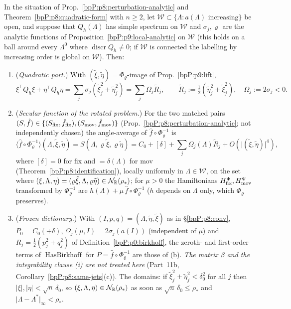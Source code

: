 \begin{theorem}\label{bpP:p9:diagonalize}
In the situation of Prop.~\ref{bpP:p8:perturbation-analytic} and Theorem~\ref{bpP:p8:quadratic-form} with $n\ge2$, let $\mathcal W\subset\{\Lambda:a(\Lambda)\text{ increasing}\}$ be open, and suppose that $Q_h(\Lambda)$ has simple spectrum on $\mathcal W$ and $\sigma_j,\varrho$ are the analytic functions of Proposition~\ref{bpP:p9:local-analytic} on $\mathcal W$ (this holds on a ball around every $\Lambda^0$ where $\operatorname{discr}Q_h\ne0$; if $\mathcal W$ is connected the labelling by increasing order is global on $\mathcal W$). Then:
\begin{enumerate}[label=(\alph*)]
\item (\emph{Quadratic part.}) With $(\tilde\xi,\tilde\eta)=\Phi_\varrho$-image of Prop.~\ref{bpP:p9:lift},
\[\xi^\top Q_h\xi+\eta^\top Q_h\eta=\sum_j\sigma_j(\tilde\xi_j^2+\tilde\eta_j^2)=\sum_j\Omega_j\tilde R_j,\qquad \tilde R_j:=\tfrac12(\tilde\eta_j^2+\tilde\xi_j^2),\quad\Omega_j:=2\sigma_j<0 .\]
\item (\emph{Secular function of the rotated problem.}) For the two matched pairs $(S,\hat f)\in\{(S_{\rm fix},\hat f_{\rm fix}),(S_{\rm mov},\hat f_{\rm mov})\}$ (Prop.~\ref{bpP:p8:perturbation-analytic}; not independently chosen) the angle-average of $\hat f\circ\Phi_\varrho^{-1}$ is
\[\big\langle\hat f\circ\Phi_\varrho^{-1}\big\rangle(\Lambda,\tilde\xi,\tilde\eta)=S(\Lambda,\varrho\tilde\xi,\varrho\tilde\eta)=C_0+[\delta]+\sum_j\Omega_j(\Lambda)\tilde R_j+O(\lvert(\tilde\xi,\tilde\eta)\rvert^4),\]
where $[\delta]=0$ for fix and $=\delta(\Lambda)$ for mov (Theorem~\ref{bpP:p8:identification}), locally uniformly in $\Lambda\in\mathcal W$, on the set where $(\xi,\Lambda,\eta)=(\varrho\tilde\xi,\Lambda,\varrho\tilde\eta)\in\mathcal N_{\mathbb{R}}(\rho_*)$; for $\mu>0$ the Hamiltonians $H_{\rm fix}^\Psi,H_{\rm mov}^\Psi$ transformed by $\Phi_\varrho^{-1}$ are $h(\Lambda)+\mu\,\hat f\circ\Phi_\varrho^{-1}$ ($h$ depends on $\Lambda$ only, which $\Phi_\varrho$ preserves).
\item (\emph{Frozen dictionary.}) With $(I,p,q)=(\Lambda,\tilde\eta,\tilde\xi)$ as in \S\ref{bpP:p8:conv}, $P_0=C_0(+\delta)$, $\Omega_j(\mu,I)=2\sigma_j(a(I))$ (independent of $\mu$) and $R_j=\tfrac12(p_j^2+q_j^2)$ of Definition~\ref{bpP:p0:birkhoff}, the zeroth- and first-order terms of $\operatorname{HasBirkhoff}$ for $P=\hat f\circ\Phi_\varrho^{-1}$ are those of (b). \emph{The matrix $\beta$ and the integrability clause (i) are not treated here} (Part~11b, Corollary~\ref{bpP:p8:same-jets}(c)). The domains: if $\tilde\xi_j^2+\tilde\eta_j^2<\delta_0^2$ for all $j$ then $\lvert\xi\rvert,\lvert\eta\rvert<\sqrt n\,\delta_0$, so $(\xi,\Lambda,\eta)\in\mathcal N_{\mathbb{R}}(\rho_*)$ as soon as $\sqrt n\,\delta_0\le\rho_*$ and $\lvert\Lambda-\Lambda^*\rvert_\infty<\rho_*$.

\end{enumerate}
\end{theorem}
